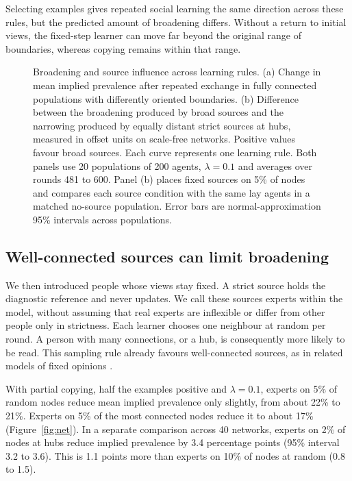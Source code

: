 \documentclass[11pt]{article}
\begin{document}
Selecting examples gives repeated social learning the same direction across these rules, but the predicted amount of broadening differs. Without a return to initial views, the fixed-step learner can move far beyond the original range of boundaries, whereas copying remains within that range.

\begin{figure}[tbp]
\centering
\resizebox{\textwidth}{!}{\figlearningrules}
\caption{Broadening and source influence across learning rules. (a) Change in mean implied prevalence after repeated exchange in fully connected populations with differently oriented boundaries. (b) Difference between the broadening produced by broad sources and the narrowing produced by equally distant strict sources at hubs, measured in offset units on scale-free networks. Positive values favour broad sources. Each curve represents one learning rule. Both panels use 20 populations of 200 agents, $\lambda=0.1$ and averages over rounds 481 to 600. Panel (b) places fixed sources on 5\% of nodes and compares each source condition with the same lay agents in a matched no-source population. Error bars are normal-approximation 95\% intervals across populations.}
\label{fig:rules}
\end{figure}

\subsection{Well-connected sources can limit broadening}
\label{sec:net}

We then introduced people whose views stay fixed. A strict source holds the diagnostic reference and never updates. We call these sources experts within the model, without assuming that real experts are inflexible or differ from other people only in strictness. Each learner chooses one neighbour at random per round. A person with many connections, or a hub, is consequently more likely to be read. This sampling rule already favours well-connected sources, as in related models of fixed opinions \citep{mobilia2007}.

With partial copying, half the examples positive and $\lambda=0.1$, experts on 5\% of random nodes reduce mean implied prevalence only slightly, from about 22\% to 21\%. Experts on 5\% of the most connected nodes reduce it to about 17\% (Figure~\ref{fig:net}). In a separate comparison across 40 networks, experts on 2\% of nodes at hubs reduce implied prevalence by 3.4 percentage points (95\% interval 3.2 to 3.6). This is 1.1 points more than experts on 10\% of nodes at random (0.8 to 1.5).
\end{document}
